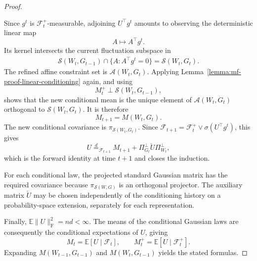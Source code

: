 \begin{proof}
\begin{enumerate}[wide]
            Since $g^t$ is $\mathcal F_t^+$-measurable,
            adjoining $U^\top g^t$ amounts to observing
            the deterministic linear map
            \[
                A\longmapsto A^\top g^t.
            \]
            Its kernel intersects the current fluctuation
            subspace in
            \[
            \begin{aligned}
                \mathcal S(W_t,G_{t-1})
                \cap\{A:A^\top g^t=0\}
                =
                \mathcal S(W_t,G_t).
            \end{aligned}
            \]
            The refined affine constraint set is
            $\mathcal A(W_t,G_t)$.
            Applying
            Lemma~\ref{lemma:mf-proof-linear-conditioning}
            again, and using
            \[
                M_t^+\perp\mathcal S(W_t,G_{t-1}),
            \]
            shows that the new conditional mean is the unique
            element of $\mathcal A(W_t,G_t)$ orthogonal to
            $\mathcal S(W_t,G_t)$. It is therefore
            \[
                M_{t+1}
                =
                M(W_t,G_t).
            \]
            The new conditional covariance is
            $\pi_{\mathcal S(W_t,G_t)}$.
            Since
            $\mathcal F_{t+1}
                =\mathcal F_t^+\vee\sigma(U^\top g^t)$,
            this gives
            \[
                U\stackrel d=_{\mathcal F_{t+1}}
                M_{t+1}
                +\Pi_{G_t}^\perp\check U\Pi_{W_t}^\perp,
            \]
            which is the forward identity at time $t+1$
            and closes the induction.
        \end{enumerate}
        
        For each conditional law, the projected standard Gaussian
        matrix has the required covariance because
        $\pi_{\mathcal{S}(W,G)}$ is an orthogonal projector.
        The auxiliary matrix $\check U$ may be chosen independently
        of the conditioning history on a probability-space extension,
        separately for each representation.
        
        Finally, $\mathbb E\|U\|_{\mathrm F}^2=nd<\infty$.
        The means of the conditional Gaussian laws are consequently
        the conditional expectations of $U$, giving
        \[
            M_t=\mathbb E[U\mid\mathcal F_t],
            \qquad
            M_t^+=\mathbb E[U\mid\mathcal F_t^+].
        \]
        Expanding $M(W_{t-1},G_{t-1})$ and
        $M(W_t,G_{t-1})$ yields the stated formulas.
        \end{proof}


